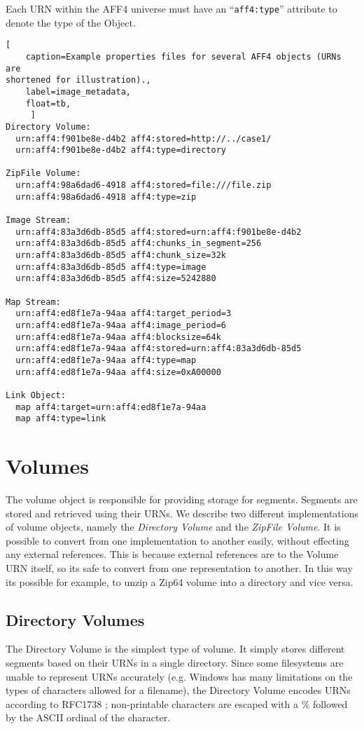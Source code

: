 \documentclass[10pt, conference]{IEEEtran}
\begin{document}
Each URN within the AFF4 universe must have an ``\texttt{aff4:type}''
attribute to denote the type of the Object.

\begin{lstlisting}[
	caption=Example properties files for several AFF4 objects (URNs are
shortened for illustration).,
	label=image_metadata,
	float=tb,
	 ]
Directory Volume:
  urn:aff4:f901be8e-d4b2 aff4:stored=http://../case1/
  urn:aff4:f901be8e-d4b2 aff4:type=directory

ZipFile Volume:
  urn:aff4:98a6dad6-4918 aff4:stored=file:///file.zip
  urn:aff4:98a6dad6-4918 aff4:type=zip

Image Stream:
  urn:aff4:83a3d6db-85d5 aff4:stored=urn:aff4:f901be8e-d4b2
  urn:aff4:83a3d6db-85d5 aff4:chunks_in_segment=256
  urn:aff4:83a3d6db-85d5 aff4:chunk_size=32k
  urn:aff4:83a3d6db-85d5 aff4:type=image
  urn:aff4:83a3d6db-85d5 aff4:size=5242880

Map Stream:
  urn:aff4:ed8f1e7a-94aa aff4:target_period=3
  urn:aff4:ed8f1e7a-94aa aff4:image_period=6
  urn:aff4:ed8f1e7a-94aa aff4:blocksize=64k
  urn:aff4:ed8f1e7a-94aa aff4:stored=urn:aff4:83a3d6db-85d5
  urn:aff4:ed8f1e7a-94aa aff4:type=map
  urn:aff4:ed8f1e7a-94aa aff4:size=0xA00000

Link Object:
  map aff4:target=urn:aff4:ed8f1e7a-94aa
  map aff4:type=link
\end{lstlisting}

\section{Volumes}
The volume object is responsible for providing storage for
segments. Segments are stored and retrieved using their URNs. We
describe two different implementations of volume objects, namely the
{\em Directory Volume} and the {\em ZipFile Volume}. It is possible to
convert from one implementation to another easily, without effecting
any external references. This is because external references are to
the Volume URN itself, so its safe to convert from one representation
to another. In this way its possible for example, to unzip a Zip64
volume into a directory and vice versa.

\subsection{Directory Volumes}
The Directory Volume is the simplest type of volume. It simply stores
different segments based on their URNs in a single directory. Since
some filesystems are unable to represent URNs accurately (e.g. Windows
has many limitations on the types of characters allowed for a
filename), the Directory Volume encodes URNs according to RFC1738
\cite{RFC1738}; non-printable characters are escaped with a \%
followed by the ASCII ordinal of the character.
\end{document}
